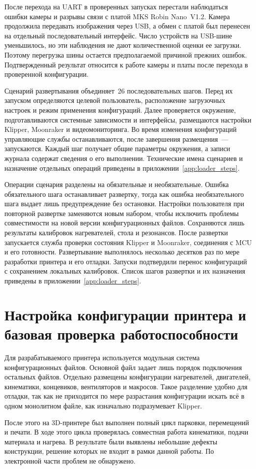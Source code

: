 После перехода на UART в проверенных запусках перестали наблюдаться ошибки камеры и разрывы связи с платой MKS Robin Nano~V1.2. Камера продолжила передавать изображения через USB, а обмен с платой был перенесен на отдельный последовательный интерфейс. Число устройств на USB-шине уменьшилось, но эти наблюдения не дают количественной оценки ее загрузки. Поэтому перегрузка шины остается предполагаемой причиной прежних ошибок. Подтвержденный результат относится к работе камеры и платы после перехода в проверенной конфигурации.

Сценарий развертывания объединяет~26 последовательных шагов. Перед их запуском определяются целевой пользователь, расположение загрузочных настроек и режим применения конфигураций. Далее проверяется окружение, подготавливаются системные зависимости и интерфейсы, размещаются настройки Klipper, Moonraker и видеомониторинга. Во время изменения конфигураций управляющие службы останавливаются, после завершения размещения~--- запускаются. Каждый шаг получает общие параметры окружения, а записи журнала содержат сведения о его выполнении. Технические имена сценариев и назначение отдельных операций приведены в приложении~\ref{app:loader_steps}.

Операции сценария разделены на обязательные и необязательные. Ошибка обязательного шага останавливает развертку, тогда как ошибка необязательного шага выдает лишь предупреждение без остановки. Настройки пользователя при повторной развертке заменяются новым набором, чтобы исключить проблемы совместимости на новой версии конфигурационных файлов. Сохраняются лишь результаты калибровок нагревателей, стола и резонансов. После развертки запускается служба проверки состояния Klipper и Moonraker, соединения с MCU и его готовности. Развертывание выполнялось несколько десятков раз по мере разработки принтера и его отладки. Запуски подтвердили перенос конфигураций с сохранением локальных калибровок. Список шагов развертки и их назначения приведены в приложении~\ref{app:loader_steps}.

\section{Настройка конфигурации принтера и базовая проверка работоспособности}

Для разрабатываемого принтера используется модульная система конфигурационных файлов. Основной файл задает лишь порядок подключения остальных файлов. Отдельно размещены конфигурации нагревателей, двигателей, кинематики, концевиков, вентиляторов и макросов. Такое разделение удобно для отладки, так как не приходится по мере разрастания конфигурации искать всё в одном монолитном файле, как изначально подразумевает Klipper.

После этого на 3D-принтере был выполнен полный цикл парковки, перемещений и печати. В ходе этого цикла проверялась совместная работа кинематики, подачи материала и нагрева. В результате были выявлены небольшие дефекты конструкции, решение которых не входит в рамки данной работы. По электронной части проблем не обнаружено.


